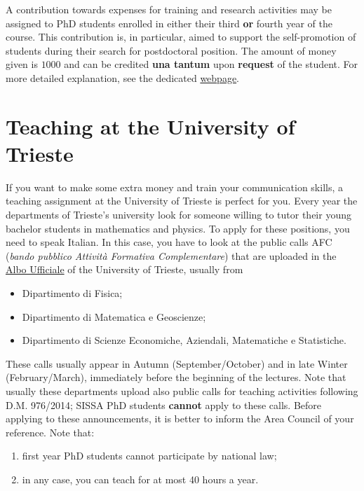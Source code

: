 \documentclass{sissavademecum}
\begin{document}
A contribution towards expenses for training and research activities may be assigned to PhD students enrolled in either their third \textbf{or} fourth year of the course. This contribution is, in particular, aimed to support the self-promotion of students during their search for postdoctoral position. The amount of money given is \EUR{} $1000$ and can be credited \textbf{una tantum} upon \textbf{request} of the student. For more detailed explanation, see the dedicated \href{https://wiki.sissa.it/students/index.php/Training_and_research_contribution}{webpage}.


\section{Teaching at the University of Trieste}

If you want to make some extra money and train your communication skills, a teaching assignment at the University of Trieste is perfect for you. Every year the departments of Trieste's university look for someone willing to tutor their young bachelor students in mathematics and physics. To apply for these positions, you need to speak Italian. In this case, you have to look at the public calls AFC (\emph{bando pubblico Attività Formativa Complementare}) that are uploaded in the \href{https://www.units.it/ateneo/albo}{Albo Ufficiale} of the University of Trieste, usually from 
\begin{itemize}
    \item Dipartimento di Fisica;
    \item Dipartimento di Matematica e Geoscienze;
    \item Dipartimento di Scienze Economiche, Aziendali, Matematiche e Statistiche.
\end{itemize}
These calls usually appear in Autumn (September/October) and in late Winter (February/March), immediately before the beginning of the lectures. Note that usually these departments upload also public calls for teaching activities following D.M. 976/2014; SISSA PhD students \textbf{cannot} apply to these calls. Before applying to these announcements, it is better to inform the Area Council of your reference. Note that:
\begin{enumerate}
    \item first year PhD students cannot participate by national law;
    \item in any case, you can teach for at most 40 hours a year. 
\end{enumerate}
\end{document}
